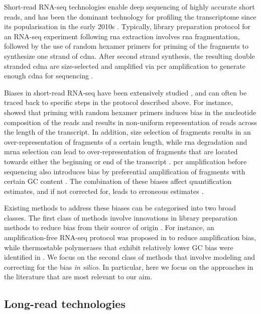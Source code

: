 Short-read RNA-seq technologies enable deep sequencing of highly accurate short reads, and has been the dominant technology for profiling the transcriptome since its popularisation in the early 2010s \cite{Lowe2017}. Typically, library preparation protocol for an RNA-seq experiment following \gls{rna} extraction involves \gls{rna} fragmentation, followed by the use of random hexamer primers for priming of the fragments to synthesize one strand of \gls{cdna}. After second strand synthesis, the resulting double stranded \gls{cdna} are size-selected and amplified via \gls{pcr} amplification to generate enough \gls{cdna} for sequencing \cite{Marguerat2010}.  

Biases in short-read RNA-seq have been extensively studied \cite{Hansen2010, Li2010, Li2011, Zhengpeng2010, Roberts2011, Benjamini2012, Lahens2014, Love2016}, and can often be traced back to specific steps in the protocol described above. For instance, \cite{Hansen2010} showed that priming with random hexamer primers induces bias in the nucleotide composition of the reads and results in non-uniform representation of reads across the length of the transcript. In addition, size selection of fragments results in an over-representation of fragments of a certain length, while \gls{rna} degradation and \gls{mrna} selection can lead to over-representation of fragments that are located towards either the beginning or end of the transcript \cite{Roberts2011, Lahens2014, Love2016}. \gls{pcr} amplification before sequencing also introduces bias by preferential amplification of fragments with certain GC content \cite{Benjamini2012, Love2016}. The combination of these biases affect quantification estimates, and if not corrected for, leads to erroneous estimates \cite{Roberts2011, Love2016}. 

Existing methods to address these biases can be categorised into two broad classes. The first class of methods involve innovations in library preparation methods to reduce bias from their source of origin \cite{Vandijk2014}. For instance, an amplification-free RNA-seq protocol was proposed in \cite{Mamanova2010} to reduce amplification bias, while thermostable polymerases that exhibit relatively lower GC bias were identified in \cite{Quail2012}. We focus on the second class of methods that involve modeling and correcting for the bias \textit{in silico}. In particular, here we focus on the approaches in the literature that are most relevant to our aim. 

\subsection{Long-read technologies}

